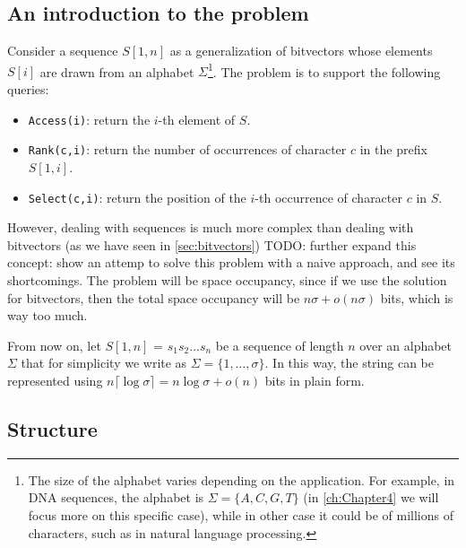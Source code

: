 \subsection*{An introduction to the problem}
Consider a sequence $S[1,n]$ as a generalization of bitvectors whose elements $S[i]$ are drawn from an alphabet $\Sigma$\footnote{The size of the alphabet varies depending on the application. For example, in DNA sequences, the alphabet is $\Sigma = \{A,C,G,T\}$ (in \autoref{ch:Chapter4} we will focus more on this specific case), while in other case it could be of millions of characters, such as in natural language processing.}. The problem is to support the following queries:

\begin{itemize}
    \item \texttt{Access(i)}: return the $i$-th element of $S$.
    \item \texttt{Rank(c,i)}: return the number of occurrences of character $c$ in the prefix $S[1,i]$.
    \item \texttt{Select(c,i)}: return the position of the $i$-th occurrence of character $c$ in $S$.
\end{itemize}
However, dealing with sequences is much more complex than dealing with bitvectors (as we have seen in \autoref{sec:bitvectors})
\noindent TODO: further expand this concept: show an attemp to solve this problem with a naive approach, and see its shortcomings. The problem will be space occupancy, since if we use the solution for bitvectors, then the total space occupancy will be $n\sigma + o(n\sigma)$ bits, which is way too much. \cite{navarro2016compact} \vspace{0.4cm}

\noindent From now on, let $S[1,n]$ = $s_1s_2\dots s_n$ be a sequence of length $n$ over an alphabet $\Sigma$ that for simplicity we write as $\Sigma = \{1,\dots,\sigma\}$. In this way, the string can be represented using $n \lceil \log \sigma \rceil = n \log \sigma + o(n)$ bits in plain form.

\subsection{Structure}

